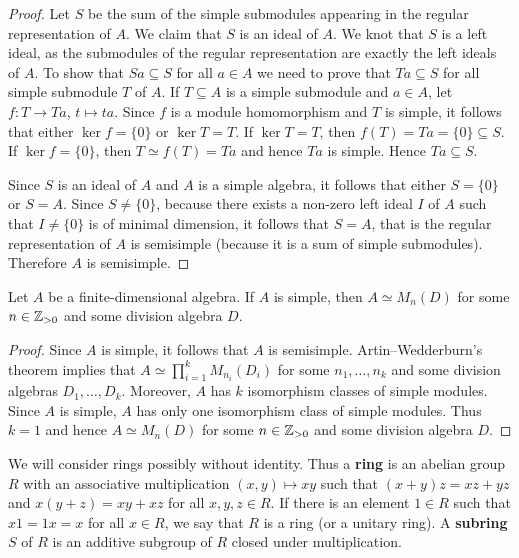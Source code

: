 \begin{proof}
	Let $S$ be the sum of the simple submodules appearing in the regular representation of $A$. 
	We claim that $S$ is an ideal of $A$. We knot that $S$ is a left ideal, as the submodules of the regular representation
	are exactly the left ideals of $A$. To show that $Sa\subseteq S$ for all $a\in A$ we need to prove that 
	$Ta\subseteq S$ for all simple submodule $T$ of $A$. If $T\subseteq A$ is a simple submodule and $a\in A$, 
	let $f\colon T\to Ta$, $t\mapsto ta$. Since $f$ is a module homomorphism and $T$ is simple, it follows that
	either $\ker f=\{0\}$ or $\ker T=T$. If $\ker T=T$, then 
	$f(T)=Ta=\{0\}\subseteq S$. If $\ker f=\{0\}$, then $T\simeq f(T)=Ta$ and hence $Ta$ is simple. Hence $Ta\subseteq S$. 
	
	Since $S$ is an ideal of $A$ and $A$
	is a simple algebra, it follows that either $S=\{0\}$ or $S=A$.  Since $S\ne\{0\}$, because  
	there exists a non-zero left ideal $I$ of $A$ such that $I\ne\{0\}$ is of minimal dimension, 
	it follows that $S=A$, that is the regular representation of $A$ is semisimple (because it is a sum of simple submodules). Therefore 
	$A$ is semisimple. 
\end{proof}

\begin{theorem}[Wedderburn]
	Let $A$ be a finite-dimensional algebra. If $A$ is simple, then 
	$A\simeq M_n(D)$ for some $n\in\mathbb{Z}_{>0}$ and some division algebra $D$. 
\end{theorem}

\begin{proof}
	Since $A$ is simple, it follows that $A$ is semisimple. Artin--Wedderburn's theorem implies that $A\simeq\prod_{i=1}^k M_{n_i}(D_i)$ 
	for some $n_1,\dots,n_k$ and some division algebras $D_1,\dots,D_k$. Moreover, $A$ has 
	$k$ isomorphism classes of simple modules. Since $A$ is simple,
	$A$ has only one isomorphism class of simple modules. Thus $k=1$ and hence 
	$A\simeq M_n(D)$ for some $n\in\mathbb{Z}_{>0}$ and some division algebra $D$. 
\end{proof}





\label{Primitive rings}

We will consider rings possibly without identity. Thus  
a \textbf{ring} is an abelian group $R$ with an associative multiplication 
$(x,y)\mapsto xy$ such that $(x+y)z=xz+yz$ and $x(y+z)=xy+xz$ for all $x,y,z\in
R$. If there is an element $1\in R$ such that $x1=1x=x$ for all $x\in R$, we 
say that $R$ is a ring (or a unitary ring).  A \textbf{subring} $S$ of $R$ is an additive
subgroup of $R$ closed under multiplication. 

